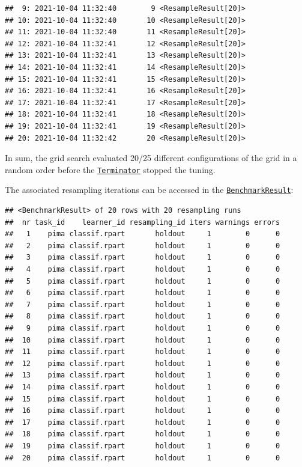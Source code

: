 \documentclass[
]{scrbook}
\newenvironment{Shaded}{\begin{snugshade}}{\end{snugshade}}
\newcommand{\NormalTok}[1]{#1}
\newcommand{\SpecialCharTok}[1]{\textcolor[rgb]{0.00,0.00,0.00}{#1}}
\renewenvironment{Shaded} {\begin{snugshade}\small} {\end{snugshade}}
\begin{document}
\begin{verbatim}
##  9: 2021-10-04 11:32:40        9 <ResampleResult[20]>
## 10: 2021-10-04 11:32:40       10 <ResampleResult[20]>
## 11: 2021-10-04 11:32:40       11 <ResampleResult[20]>
## 12: 2021-10-04 11:32:41       12 <ResampleResult[20]>
## 13: 2021-10-04 11:32:41       13 <ResampleResult[20]>
## 14: 2021-10-04 11:32:41       14 <ResampleResult[20]>
## 15: 2021-10-04 11:32:41       15 <ResampleResult[20]>
## 16: 2021-10-04 11:32:41       16 <ResampleResult[20]>
## 17: 2021-10-04 11:32:41       17 <ResampleResult[20]>
## 18: 2021-10-04 11:32:41       18 <ResampleResult[20]>
## 19: 2021-10-04 11:32:41       19 <ResampleResult[20]>
## 20: 2021-10-04 11:32:42       20 <ResampleResult[20]>
\end{verbatim}

In sum, the grid search evaluated 20/25 different configurations of the grid in a random order before the \href{https://bbotk.mlr-org.com/reference/Terminator.html}{\texttt{Terminator}} stopped the tuning.

The associated resampling iterations can be accessed in the \href{https://mlr3.mlr-org.com/reference/BenchmarkResult.html}{\texttt{BenchmarkResult}}:

\begin{Shaded}
\end{Shaded}

\begin{verbatim}
## <BenchmarkResult> of 20 rows with 20 resampling runs
##  nr task_id    learner_id resampling_id iters warnings errors
##   1    pima classif.rpart       holdout     1        0      0
##   2    pima classif.rpart       holdout     1        0      0
##   3    pima classif.rpart       holdout     1        0      0
##   4    pima classif.rpart       holdout     1        0      0
##   5    pima classif.rpart       holdout     1        0      0
##   6    pima classif.rpart       holdout     1        0      0
##   7    pima classif.rpart       holdout     1        0      0
##   8    pima classif.rpart       holdout     1        0      0
##   9    pima classif.rpart       holdout     1        0      0
##  10    pima classif.rpart       holdout     1        0      0
##  11    pima classif.rpart       holdout     1        0      0
##  12    pima classif.rpart       holdout     1        0      0
##  13    pima classif.rpart       holdout     1        0      0
##  14    pima classif.rpart       holdout     1        0      0
##  15    pima classif.rpart       holdout     1        0      0
##  16    pima classif.rpart       holdout     1        0      0
##  17    pima classif.rpart       holdout     1        0      0
##  18    pima classif.rpart       holdout     1        0      0
##  19    pima classif.rpart       holdout     1        0      0
##  20    pima classif.rpart       holdout     1        0      0
\end{verbatim}
\end{document}
